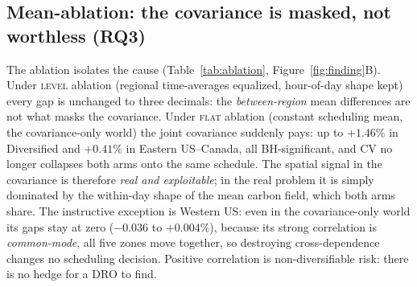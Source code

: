 \documentclass[10pt,twocolumn]{article}
\begin{document}
\begin{table}[t]
\centering\small
\caption{Robustness battery: maximum $|$gap$|$ (\%) per covariance estimator, and
temporal walk-forward (test year 2024). No cell passes the pre-committed
agreement rule (positive and sign-stable under both seasonal and AR(1)
residualization).}
\label{tab:robust}
\end{table}

\subsection{Mean-ablation: the covariance is masked, not worthless
(RQ3)}\label{sec:res-ablation}
The ablation isolates the cause (Table~\ref{tab:ablation},
Figure~\ref{fig:finding}B). Under \textsc{level} ablation (regional
time-averages equalized, hour-of-day shape kept) every gap is unchanged to
three decimals: the \emph{between-region} mean differences are not what masks the
covariance. Under \textsc{flat} ablation (constant scheduling mean, the
covariance-only world) the joint covariance suddenly pays: up to $+1.46\%$ in
Diversified and $+0.41\%$ in Eastern US--Canada, all BH-significant, and CV no
longer collapses both arms onto the same schedule. The spatial signal in the
covariance is therefore \emph{real and exploitable}; in the real problem it is
simply dominated by the within-day shape of the mean carbon field, which both arms
share. The instructive exception is Western US: even in the covariance-only
world its gaps stay at zero ($-0.036$ to $+0.004\%$), because its strong
correlation is \emph{common-mode}, all five zones move together, so destroying
cross-dependence changes no scheduling decision. Positive correlation is
non-diversifiable risk: there is no hedge for a DRO to find.
\end{document}
